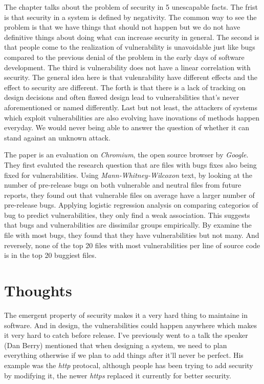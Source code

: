 \documentclass[sigconf]{acmart}
\begin{document}
The chapter talks about the problem of security in 5 unescapable facts. The frist is that security in a system is defined by negativity. The common way to see the problem is that we have things that should not happen but we do not have definitive things about doing what can increase security in general. The second is that people come to the realization of vulnerability is unavoidable just like bugs compared to the previous denial of the problem in the early days of software development. The third is vulnerability does not have a linear correlation with security. The general idea here is that vulenrability have different effects and the effect to security are different. The forth is that there is a lack of tracking on design decisions and often flawed design lead to vulnerabilities that's never aforementioned or named differently. Last but not least, the attackers of systems which exploit vulnerabilities are also evolving have inovations of methods happen everyday. We would never being able to answer the question of whether it can stand against an unknown attack.

The paper is an evaluation on {\it Chromium}, the open source browser by {\it Google}. They first evaluted the research question that are files with bugs fixes also being fixed for vulnerabilities. Using {\it Mann-Whitney-Wilcoxon} text, by looking at the number of pre-release bugs on both vulnerable and neutral files from future reports, they found out that vulnerable files on average have a larger number of pre-release bugs. Applying logistic regression analysis on comparing categorios of bug to predict vulnerabilities, they only find a weak association. This suggests that bugs and vulnerabilities are dissimilar groups empirically. By examine the file with most bugs, they found that they have vulnerabilities but not many. And reversely, none of the top 20 files with most vulnerabilities per line of source code is in the top 20 buggiest files.

\section{Thoughts}

The emergent property of security makes it a very hard thing to maintaine in software. And in design, the vulnerabilities could happen anywhere which makes it very hard to catch before release. I've previously went to a talk the speaker (Dan Berry) mentioned that when designing a system, we need to plan everything otherwise if we plan to add things after it'll never be perfect. His example was the {\it http} protocal, although people has been trying to add security by modifying it, the newer {\it https} replaced it currently for better security. 
\end{document}
